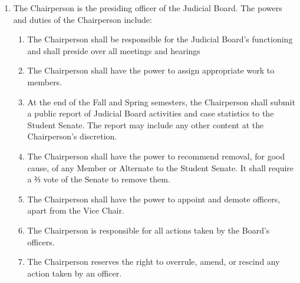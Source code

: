 \begin{enumerate}
\item The Chairperson is the presiding officer of the Judicial Board. The powers and duties of the Chairperson include: 
\begin{enumerate}
    \item The Chairperson shall be responsible for the Judicial Board's functioning and shall preside over all meetings and hearings
    \item The Chairperson shall have the power to assign appropriate work to members. 
    \item At the end of the Fall and Spring semesters, the Chairperson shall submit a public report of Judicial Board activities and case statistics to the Student Senate. The report may include any other content at the Chairperson's discretion.
    \item The Chairperson shall have the power to recommend removal, for good cause, of any Member or Alternate to the Student Senate. It shall require a ⅔ vote of the Senate to remove them. 
    \item The Chairperson shall have the power to appoint and demote officers, apart from the Vice Chair. 
    \item The Chairperson is responsible for all actions taken by the Board's officers.
    \item The Chairperson reserves the right to overrule, amend, or rescind any action taken by an officer.


\end{enumerate}
\end{enumerate}

